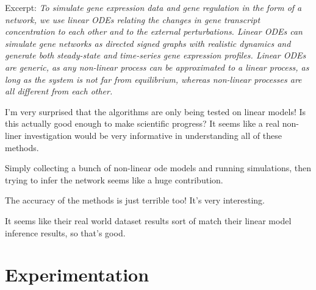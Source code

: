 \documentclass{article}
\begin{document}
        Excerpt: \textit{To simulate gene expression data and gene regulation in
        the form of a network, we use linear ODEs relating the changes in gene
        transcript concentration to each other and to the external
        perturbations. Linear ODEs can simulate gene networks as directed signed
        graphs with realistic dynamics and generate both steady-state and
        time-series gene expression profiles. Linear ODEs are generic, as any
        non-linear process can be approximated to a linear process, as long as
        the system is not far from equilibrium, whereas non-linear processes are
        all different from each other.}
        
        I'm very surprised that the algorithms are only being tested on linear
        models! Is this actually good enough to make scientific progress? It
        seems like a real non-liner investigation would be very informative in
        understanding all of these methods.

        Simply collecting a bunch of non-linear ode models and running
        simulations, then trying to infer the network seems like a huge
        contribution.
        
        The accuracy of the methods is just terrible too! It's very interesting.

        It seems like their real world dataset results sort of match their
        linear model inference results, so that's good.

\section*{Experimentation}
\end{document}
